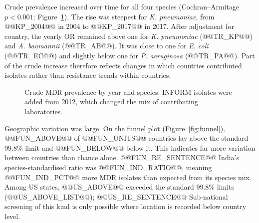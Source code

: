 \documentclass[11pt,a4paper]{article}
\newcommand{\sci}[1]{\textit{#1}}
\begin{document}
Crude prevalence increased over time for all four species (Cochran--Armitage $p<0.001$; Figure~\ref{fig:trend}). The rise was steepest for \sci{K. pneumoniae}, from @@KP_2004@@ in 2004 to @@KP_2017@@ in 2017. After adjustment for country, the yearly OR remained above one for \sci{K. pneumoniae} (@@TR_KP@@) and \sci{A. baumannii} (@@TR_AB@@). It was close to one for \sci{E. coli} (@@TR_EC@@) and slightly below one for \sci{P. aeruginosa} (@@TR_PA@@). Part of the crude increase therefore reflects changes in which countries contributed isolates rather than resistance trends within countries.

\begin{figure}[t]
\centering
{}
\caption{Crude MDR prevalence by year and species. INFORM isolates were added from 2012, which changed the mix of contributing laboratories.}
\label{fig:trend}
\end{figure}

Geographic variation was large. On the funnel plot (Figure~\ref{fig:funnel}), @@FUN_ABOVE@@ of @@FUN_UNITS@@ countries lay above the standard 99.8\% limit and @@FUN_BELOW@@ below it. This indicates far more variation between countries than chance alone. @@FUN_RE_SENTENCE@@ India's species-standardised ratio was @@FUN_IND_RATIO@@, meaning @@FUN_IND_PCT@@ more MDR isolates than expected from its species mix. Among US states, @@US_ABOVE@@ exceeded the standard 99.8\% limits (@@US_ABOVE_LIST@@); @@US_RE_SENTENCE@@ Sub-national screening of this kind is only possible where location is recorded below country level.
\end{document}
